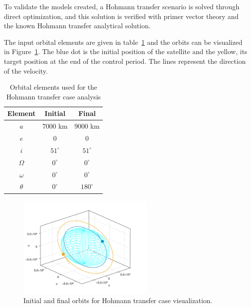 To validate the models created, a Hohmann transfer scenario is solved through direct optimization, and this solution is verified with primer vector theory and the known Hohmann transfer analytical solution.

The input orbital elements are given in table~\ref{tab:hohmann_orb_elems} and the orbits can be visualized in Figure~\ref{fig:hohmann_condition}. The blue dot is the initial position of the satellite and the yellow, its target position at the end of the control period. The lines represent the direction of the velocity.

\begin{table}[htbp]
    \centering
    \begin{tabular}{ccc} \toprule
        Element & Initial & Final \\ \midrule
        \(a\)      & \(7000\) km   & \(9000\) km   \\
        \(e\)      & \(0\)        & \(0\)        \\
        \(i\)      & \(51^\circ\) & \(51^\circ\) \\
        \(\Omega\) & \(0^\circ\)  & \(0^\circ\)  \\
        \(\omega\) & \(0^\circ\)  & \(0^\circ\)  \\
        \(\theta\) & \(0^\circ\)  & \(180^\circ\)  \\ \bottomrule
    \end{tabular}
    \caption{Orbital elements used for the Hohmann transfer case analysis}
    \label{tab:hohmann_orb_elems}
\end{table}

\begin{figure}[htbp]
    \centering
    \includegraphics[width=0.6\textwidth]{img/hohmann_condition.png}
    \caption{Initial and final orbits for Hohmann transfer case visualization.}
    \label{fig:hohmann_condition}
\end{figure}

